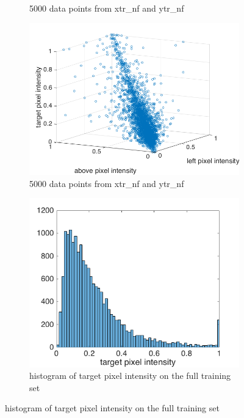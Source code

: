 \documentclass{article}
\begin{document}
\begin{enumerate}[label=(\alph*)]
\begin{figure}[htbp]
\begin{subfigure}{0.5\textwidth}
				 			\caption{5000 data points from xtr\_nf and ytr\_nf}
				 			\label{fig:p1-2-a_above_target}
				 		\end{subfigure}		
				 		\begin{subfigure}{0.5\textwidth}
				 			\includegraphics[width=\linewidth]{images/p1-2-a_closest_pixels.png}
				 			\caption{5000 data points from xtr\_nf and ytr\_nf}
				 			\label{fig:p1-2-a_closest_pixels}
				 		\end{subfigure} 
				 		\begin{subfigure}{0.5\textwidth}
				 			\includegraphics[width=\linewidth]{images/p1-2-a_target_hist.png}
				 			\caption{histogram of target pixel intensity on the full training set}

\end{subfigure}
\end{figure}
\end{enumerate}
\end{document}
